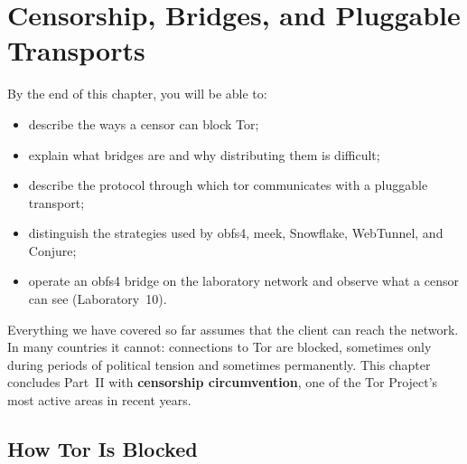 \chapter{Censorship, Bridges, and Pluggable Transports}\label{cap:16-censura}

\begin{obiettivi}
By the end of this chapter, you will be able to:
\begin{itemize}[nosep]
  \item describe the ways a censor can block Tor;
  \item explain what bridges are and why distributing them is difficult;
  \item describe the protocol through which tor communicates with a pluggable transport;
  \item distinguish the strategies used by obfs4, meek, Snowflake, WebTunnel, and Conjure;
  \item operate an obfs4 bridge on the laboratory network and observe what a censor can see (Laboratory~10).
\end{itemize}
\end{obiettivi}

Everything we have covered so far assumes that the client can reach the network. In many countries it cannot: connections to Tor are blocked, sometimes only during periods of political tension and sometimes permanently. This chapter concludes Part~II with \textbf{censorship circumvention}, one of the Tor Project's most active areas in recent years.

\section{How Tor Is Blocked}\label{sec:cens-blocco}

